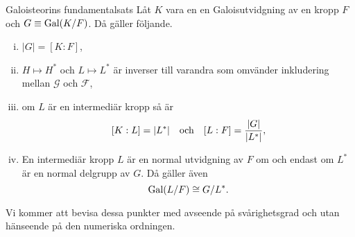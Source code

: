 \documentclass{article}
\newcommand{\gal}[0]{\textnormal{Gal}}
\theoremstyle{definition}
\begin{document}
\begin{mytheo}{Galoisteorins fundamentalsats}{}
  Låt $K$ vara en en Galoisutvidgning av en kropp $F$ och $G \equiv \gal(K/F)$. Då gäller följande.
  \begin{enumerate}[(i)]
    \item $|G| = [K:F]$,
    \item $H \mapsto H^*$ och $L \mapsto L^*$ är inverser till varandra som omvänder inkludering mellan $\mathcal{G}$ och $\mathcal{F}$,
    \item om $L$ är en intermediär kropp så är 
    \[ [K:L] = |L^*| \quad \textnormal{och} \quad [L:F] = \frac{|G|}{|L^*|}, \]
    \item En intermediär kropp $L$ är en normal utvidgning av $F$ om och endast om $L^*$ är en normal delgrupp av $G$. Då gäller även 
    \[ \gal(L/F) \cong G/L^*. \]
  \end{enumerate}
\end{mytheo}
Vi kommer att bevisa dessa punkter med avseende på svårighetsgrad och utan hänseende på den numeriska ordningen. 
\end{document}
